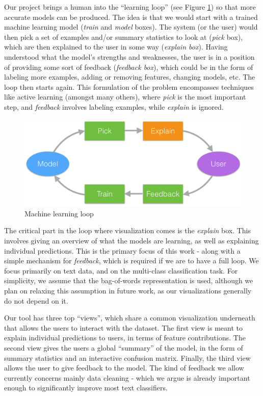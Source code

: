 \documentclass{chi2009}
\begin{document}
Our project brings a human into the “learning loop” (see Figure \ref{hmloop}) so
that more accurate models can be produced. The idea is that we would start with
a trained machine learning
model (\emph{train} and \emph{model} boxes). The system (or the user) would then
pick a set of examples and/or summary statistics to look at (\emph{pick} box),
which are then explained to the user in some way (\emph{explain box}). Having
understood what the model's strengths and weaknesses, the user is in a position
of providing some sort of feedback (\emph{feedback box}), which could be in the
form of labeling more examples, adding or removing features, changing models,
etc. The loop then starts again. This formulation of the problem encompasses
techniques like active learning (amongst many others), where \emph{pick} is the
most important step, and \emph{feedback} involves labeling examples, while
\emph{explain} is ignored.

\begin{figure}[hb]
\includegraphics[width=.5\textwidth]{feedback_loop_cropped.pdf}
\caption{Machine learning loop}
\label{hmloop}
\end{figure}
\pagebreak

The critical part in the loop where visualization comes is the \emph{explain}
box. This involves giving an overview of what the models are learning, as well
as explaining individual predictions. This is the primary focus of this work -
along with a simple mechanism for \emph{feedback}, which is required if we are
to have a full loop. We focus primarily on text data, and on the multi-class
classification task. For simplicity, we assume that the bag-of-words
representation is used, although we plan on relaxing this assumption in future
work, as our visualizations generally do not depend on it.

Our tool has three top ``views'', which share a common visualization underneath
that allows the users to interact with the dataset. The first view is meant to explain
individual predictions to users, in terms of feature contributions. The second
view gives the users a global ``summary'' of the model, in the form of summary
statistics and an interactive confusion matrix. Finally, the third view allows
the user to give feedback to the model. The kind of feedback we allow currently
concerns mainly data cleaning - which we argue is already important enough to
significantly improve most text classifiers.
\end{document}
